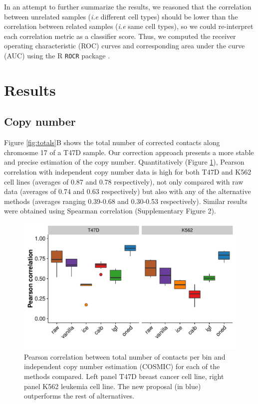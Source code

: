 \documentclass{bioinfo}
\begin{document}
\begin{methods}
In an attempt to further summarize the results, we reasoned that the correlation between unrelated samples (\textit{i.e} different cell types) should be lower than the correlation between related samples (\textit{i.e} same cell types), so we could re-interpret each correlation metric as a classifier score. Thus, we computed the receiver operating characteristic (ROC) curves and corresponding area under the curve (AUC) using the R \texttt{ROCR} package \citep{sing2005rocr}.

\end{methods}

\section{Results}

\subsection{Copy number}

Figure \ref{fig:totals}B shows the total number of corrected contacts along chromosme 17 of a T47D sample. Our correction approach presents a more stable and precise estimation of the copy number. Quantitatively (Figure \ref{fig:copy_number}), Pearson correlation with independent copy number data is high for both T47D and K562 cell lines (averages of 0.87 and 0.78 respectively), not only compared with raw data (averages of 0.74 and 0.63 respectively) but also with any of the alternative methods (averages ranging 0.39-0.68 and 0.30-0.53 respectively). Similar results were obtained using Spearman correlation (Supplementary Figure 2).


\begin{figure}
	\centerline{\includegraphics[width=.45\textwidth]{img/copy_number_figure2.pdf}}
	\caption{
		Pearson correlation between total number of contacts per bin and independent copy number estimation (COSMIC) for each of the methods compared. Left panel T47D breast cancer cell line, right panel K562 leukemia cell line. The new proposal (in blue) outperforms the rest of alternatives.
	}\label{fig:copy_number}
\end{figure}
\end{document}
